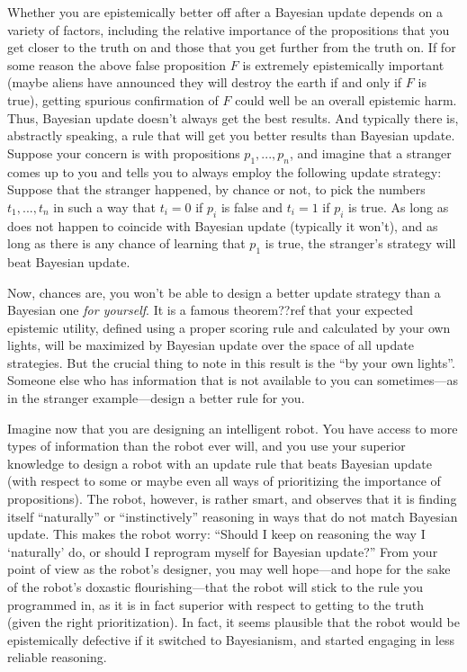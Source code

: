 Whether you are epistemically better off after a Bayesian update depends on a variety of factors, including the relative 
importance of the propositions that you get closer to the truth on and those that you get further from the truth on. 
If for some reason the above false proposition $F$ is extremely epistemically important (maybe aliens have announced they will 
destroy the earth if and only if $F$ is true), getting spurious confirmation of $F$ could well be an overall epistemic harm. 
Thus, Bayesian update doesn't always get the best results. And typically there is, abstractly speaking, 
a rule that will get you better results than Bayesian update. Suppose your concern is with propositions $p_1,...,p_n$, and 
imagine that a stranger comes up to you and tells you to always employ the following update strategy:
Suppose that the stranger happened, by chance or not, to pick the numbers $t_1,...,t_n$ in such a way that $t_i=0$ if 
$p_i$ is false and $t_i=1$ if $p_i$ is true. As long as  does not happen to coincide with Bayesian 
update (typically it won't), and as long as there is any chance of learning that $p_1$ is true, the stranger's strategy 
will beat Bayesian update. 

Now, chances are, you won't be able to design a better update strategy than a Bayesian one \textit{for yourself}.
It is a famous theorem??ref that your expected epistemic utility, defined using a proper scoring rule and calculated by your 
own lights, will be maximized by Bayesian update over the space of all update strategies. But the crucial thing to 
note in this result is the ``by your own lights''. Someone else who has information that is not available to you can 
sometimes---as in the stranger example---design a better rule for you. 

Imagine now that you are designing an intelligent robot. You have access to more types of information than the robot ever 
will, and you use your superior knowledge to design a robot with an update rule that beats Bayesian update (with respect to 
some or maybe even all ways of prioritizing the importance of propositions). The robot, however, is rather smart, 
and observes that it is finding itself ``naturally'' or ``instinctively'' reasoning in ways that do not match Bayesian update. This makes the 
robot worry: ``Should I keep on reasoning the way I `naturally' do, or should I reprogram myself for Bayesian update?''
From your point of view as the robot's designer, you may well hope---and hope for the sake of the robot's doxastic
flourishing---that the robot will stick to the rule you programmed in, as it is in fact superior with respect to getting
to the truth (given the right prioritization). In fact, it seems plausible that the robot would be epistemically defective 
if it switched to Bayesianism, and started engaging in less reliable reasoning.


